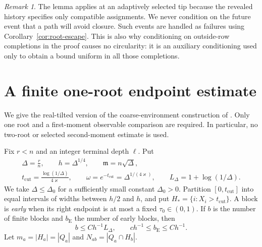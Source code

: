 \documentclass[11pt]{article}
\numberwithin{equation}{section}
\theoremstyle{definition}
\theoremstyle{remark}
\newtheorem{remark}[theorem]{Remark}
\newcommand{\mres}{\mathfrak m}
\begin{document}
\begin{remark}\label{rem:conditioning}
The lemma applies at an adaptively selected tip because the revealed history specifies only compatible assignments. We never condition on the future event that a path will avoid closure. Such events are handled as failures using Corollary~\ref{cor:root-escape}. This is also why conditioning on outside-row completions in the proof causes no circularity: it is an auxiliary conditioning used only to obtain a bound uniform in all those completions.
\end{remark}

\section{A finite one-root endpoint estimate}\label{sec:endpoint}

We give the real-tilted version of the coarse-environment construction of \cite{LongMeso}. Only one root and a first-moment observable comparison are required. In particular, no two-root or selected second-moment estimate is used.

Fix $r<n$ and an integer terminal depth $\ell$. Put
\begin{equation}\label{eq:endpoint-parameters}
 \begin{gathered}
 \Delta=\frac rn,\qquad h=\Delta^{1/4},\qquad \mres=n\sqrt\Delta,\\
 t_{\mathrm{cut}}=\frac{\log(1/\Delta)}{4\varkappa},\qquad
 \omega=e^{-t_{\mathrm{cut}}}=\Delta^{1/(4\varkappa)},\qquad
 L_\Delta=1+\log(1/\Delta).
 \end{gathered}
\end{equation}
We take $\Delta\le\Delta_0$ for a sufficiently small constant $\Delta_0>0$. Partition $[0,t_{\mathrm{cut}}]$ into equal intervals of widths between $h/2$ and $h$, and put $H_* =\{i:X_i>t_{\mathrm{cut}}\}$. A block is \emph{early} when its right endpoint is at most a fixed $\tau_0\in(0,1)$. If $b$ is the number of finite blocks and $b_{\mathrm E}$ the number of early blocks, then
\begin{equation}\label{eq:block-counts}
 b\le Ch^{-1}L_\Delta,\qquad c h^{-1}\le b_{\mathrm E}\le Ch^{-1}.
\end{equation}
Let $m_a=|H_a|=|Q_a|$ and $N_{ab}=|Q_a\cap H_b|$.
\end{document}
